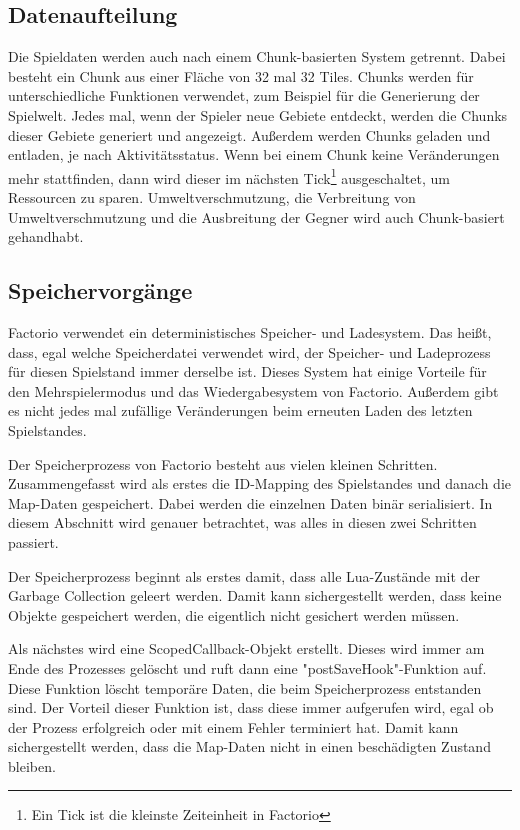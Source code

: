\subsection{Datenaufteilung} \label{ssec:factorioDatenaufteilung}
Die Spieldaten werden auch nach einem Chunk-basierten System getrennt. Dabei besteht ein Chunk aus einer Fläche von 32 mal 32 Tiles. Chunks werden für unterschiedliche Funktionen verwendet, zum Beispiel für die Generierung der Spielwelt. Jedes mal, wenn der Spieler neue Gebiete entdeckt, werden die Chunks dieser Gebiete generiert und angezeigt. Außerdem werden Chunks geladen und entladen, je nach Aktivitätsstatus. Wenn bei einem Chunk keine Veränderungen mehr stattfinden, dann wird dieser im nächsten Tick\footnote{Ein Tick ist die kleinste Zeiteinheit in Factorio\cite{factorioTime}} ausgeschaltet, um Ressourcen zu sparen. Umweltverschmutzung, die Verbreitung von Umweltverschmutzung und die Ausbreitung der Gegner wird auch Chunk-basiert gehandhabt. 
\cite{factorioMapStructure}



\subsection{Speichervorgänge}
Factorio verwendet ein deterministisches Speicher- und Ladesystem. Das heißt, dass, egal welche Speicherdatei verwendet wird, der Speicher- und Ladeprozess für diesen Spielstand immer derselbe ist. Dieses System hat einige Vorteile für den Mehrspielermodus und das Wiedergabesystem von Factorio. Außerdem gibt es nicht jedes mal zufällige Veränderungen beim erneuten Laden des letzten Spielstandes.\cite{factorioGithubSaveLoad}

Der Speicherprozess von Factorio besteht aus vielen kleinen Schritten. Zusammengefasst wird als erstes die ID-Mapping des Spielstandes und danach die Map-Daten gespeichert.
\cite{factorioFridayFacts270} Dabei werden die einzelnen Daten binär serialisiert.\cite{factorioGithubSaveLoad} In diesem Abschnitt wird genauer betrachtet, was alles in diesen zwei Schritten passiert. 

Der Speicherprozess beginnt als erstes damit, dass alle Lua-Zustände mit der Garbage Collection geleert werden. Damit kann sichergestellt werden, dass keine Objekte gespeichert werden, die eigentlich nicht gesichert werden müssen.\cite{factorioGithubSaveLoad}

Als nächstes wird eine ScopedCallback-Objekt erstellt. Dieses wird immer am Ende des Prozesses gelöscht und ruft dann eine "postSaveHook"-Funktion auf. Diese Funktion löscht temporäre Daten, die beim Speicherprozess entstanden sind. Der Vorteil dieser Funktion ist, dass diese immer aufgerufen wird, egal ob der Prozess erfolgreich oder mit einem Fehler terminiert hat. Damit kann sichergestellt werden, dass die Map-Daten nicht in einen beschädigten Zustand bleiben.\cite{factorioGithubSaveLoad}

